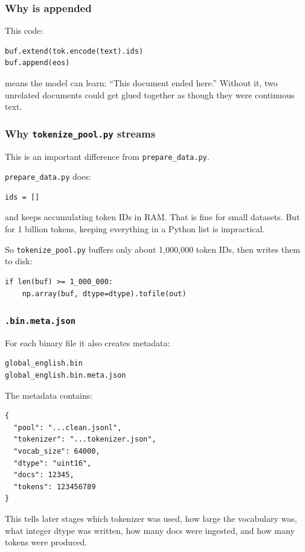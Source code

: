 \subsubsection{Why  is appended}

This code:
\begin{lstlisting}[style=shadedpython]
buf.extend(tok.encode(text).ids)
buf.append(eos)
\end{lstlisting}
means the model can learn: ``This document ended here.'' Without it, two
unrelated documents could get glued together as though they were continuous
text.

\subsubsection{Why \texttt{tokenize\_pool.py} streams}

This is an important difference from \texttt{prepare\_data.py}.

\texttt{prepare\_data.py} does:
\begin{lstlisting}[style=shadedpython]
ids = []
\end{lstlisting}
and keeps accumulating token IDs in RAM. That is fine for small datasets. But
for 1 billion tokens, keeping everything in a Python list is impractical.

So \texttt{tokenize\_pool.py} buffers only about 1{,}000{,}000 token IDs, then
writes them to disk:
\begin{lstlisting}[style=shadedpython]
if len(buf) >= 1_000_000:
    np.array(buf, dtype=dtype).tofile(out)
\end{lstlisting}

\subsubsection{\texttt{.bin.meta.json}}

For each binary file it also creates metadata:
\begin{lstlisting}[style=shadedpython,language={},basicstyle=\scriptsize\ttfamily]
global_english.bin
global_english.bin.meta.json
\end{lstlisting}
The metadata contains:
\begin{lstlisting}[style=shadedpython]
{
  "pool": "...clean.jsonl",
  "tokenizer": "...tokenizer.json",
  "vocab_size": 64000,
  "dtype": "uint16",
  "docs": 12345,
  "tokens": 123456789
}
\end{lstlisting}
This tells later stages which tokenizer was used, how large the vocabulary
was, what integer dtype was written, how many docs were ingested, and how
many tokens were produced.

